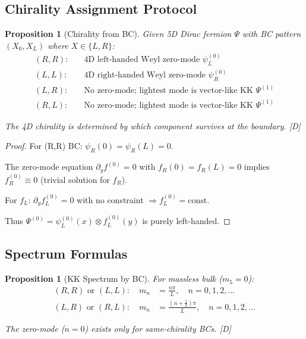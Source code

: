 \documentclass[11pt,a4paper]{article}
\newtheorem{proposition}[theorem]{Proposition}
\newcommand{\tagD}{\textcolor{blue!70!black}{[D]}}
\begin{document}
\subsection{Chirality Assignment Protocol}

\begin{proposition}[Chirality from BC]
\label{prop:chirality-bc}
Given 5D Dirac fermion $\Psi$ with BC pattern $(X_0, X_L)$ where $X \in \{L, R\}$:
\begin{align}
\label{eq:chir-RR}
(R, R): \quad & \text{4D left-handed Weyl zero-mode } \psi_L^{(0)} \\
\label{eq:chir-LL}
(L, L): \quad & \text{4D right-handed Weyl zero-mode } \psi_R^{(0)} \\
\label{eq:chir-LR}
(L, R): \quad & \text{No zero-mode; lightest mode is vector-like KK } \Psi^{(1)} \\
\label{eq:chir-RL}
(R, L): \quad & \text{No zero-mode; lightest mode is vector-like KK } \Psi^{(1)}
\end{align}

The 4D chirality is determined by which component survives at the boundary.
\tagD
\end{proposition}

\begin{proof}
For (R,R) BC: $\psi_R(0) = \psi_R(L) = 0$.

The zero-mode equation $\partial_y f^{(0)} = 0$ with $f_R(0) = f_R(L) = 0$ implies $f_R^{(0)} \equiv 0$ (trivial solution for $f_R$).

For $f_L$: $\partial_y f_L^{(0)} = 0$ with no constraint $\Rightarrow f_L^{(0)} = \text{const}$.

Thus $\Psi^{(0)} = \psi_L^{(0)}(x) \otimes f_L^{(0)}(y)$ is purely left-handed.
\end{proof}

\subsection{Spectrum Formulas}

\begin{proposition}[KK Spectrum by BC]
\label{prop:kk-spectrum}
For massless bulk ($m_5 = 0$):
\begin{align}
\label{eq:spec-RR}
(R,R) \text{ or } (L,L): \quad m_n &= \frac{n\pi}{L}, \quad n = 0, 1, 2, \ldots \\
\label{eq:spec-LR}
(L,R) \text{ or } (R,L): \quad m_n &= \frac{(n + \tfrac{1}{2})\pi}{L}, \quad n = 0, 1, 2, \ldots
\end{align}

The zero-mode ($n = 0$) exists only for same-chirality BCs.
\tagD
\end{proposition}
\end{document}
